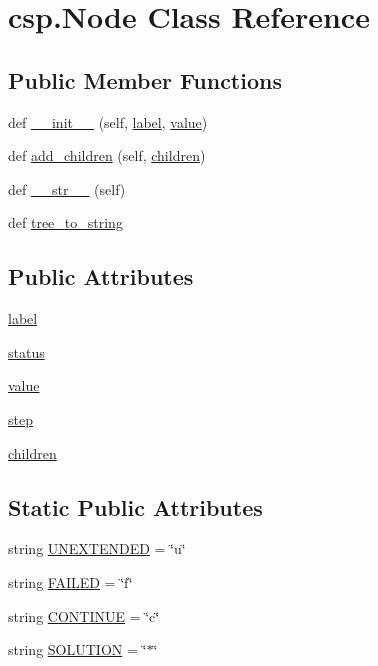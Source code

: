 \hypertarget{classcsp_1_1_node}{}\section{csp.\+Node Class Reference}
\label{classcsp_1_1_node}
\subsection*{Public Member Functions}
\begin{DoxyCompactItemize}
\item 
def \hyperlink{classcsp_1_1_node_aa36dc21f97252fc139211f65d4211895}{\+\_\+\+\_\+init\+\_\+\+\_\+} (self, \hyperlink{classcsp_1_1_node_aef9fae2c01457ce91f49a6edad3c1bf4}{label}, \hyperlink{classcsp_1_1_node_a59b36f494d919498b7a115cb7fcb889d}{value})
\item 
def \hyperlink{classcsp_1_1_node_a3adcb30b6eae5835270301dd854dfb96}{add\+\_\+children} (self, \hyperlink{classcsp_1_1_node_a043c2d7d9f42209776105c8e5fa4f0ca}{children})
\item 
def \hyperlink{classcsp_1_1_node_ac17e30051ae59558c8ab3f8b1ce47277}{\+\_\+\+\_\+str\+\_\+\+\_\+} (self)
\item 
def \hyperlink{classcsp_1_1_node_a72efb7344e6fdcde7f24840f51424ef5}{tree\+\_\+to\+\_\+string}
\end{DoxyCompactItemize}
\subsection*{Public Attributes}
\begin{DoxyCompactItemize}
\item 
\hyperlink{classcsp_1_1_node_aef9fae2c01457ce91f49a6edad3c1bf4}{label}
\item 
\hyperlink{classcsp_1_1_node_a5d6490f3695a26b990b8d8aac5e62de2}{status}
\item 
\hyperlink{classcsp_1_1_node_a59b36f494d919498b7a115cb7fcb889d}{value}
\item 
\hyperlink{classcsp_1_1_node_ad24c152aa4db47cdcaf07e9f300da283}{step}
\item 
\hyperlink{classcsp_1_1_node_a043c2d7d9f42209776105c8e5fa4f0ca}{children}
\end{DoxyCompactItemize}
\subsection*{Static Public Attributes}
\begin{DoxyCompactItemize}
\item 
string \hyperlink{classcsp_1_1_node_adb2acf3476fbb84b27a669067cef8c53}{U\+N\+E\+X\+T\+E\+N\+D\+E\+D} = \char`\"{}u\char`\"{}
\item 
string \hyperlink{classcsp_1_1_node_ac2eb7993e822d5d19f762db0a3461e56}{F\+A\+I\+L\+E\+D} = \char`\"{}f\char`\"{}
\item 
string \hyperlink{classcsp_1_1_node_ac5c40525e00ecff8035aa9494cdb3336}{C\+O\+N\+T\+I\+N\+U\+E} = \char`\"{}c\char`\"{}
\item 
string \hyperlink{classcsp_1_1_node_a233c4430c7ef9f5d4017c43abc95192b}{S\+O\+L\+U\+T\+I\+O\+N} = \char`\"{}$\ast$\char`\"{}
\end{DoxyCompactItemize}


